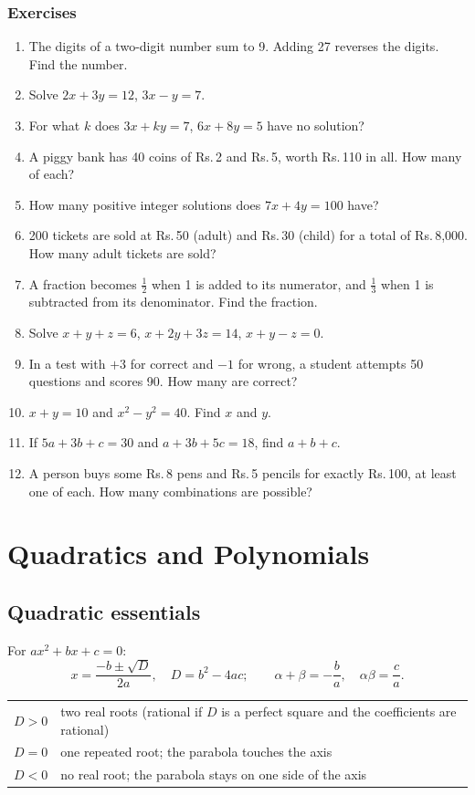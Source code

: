 \documentclass[11pt,a4paper,openany]{report}
\newenvironment{exercises}{\subsection*{Exercises \thechapter}\begin{enumerate}[label=\textbf{\thechapter.\arabic*},leftmargin=3.2em]}{\end{enumerate}}
\newcommand{\Rs}{Rs.\,}
\begin{document}
\begin{exercises}
\item The digits of a two-digit number sum to 9. Adding 27 reverses the digits. Find the number.
\item Solve $2x+3y=12$, $3x-y=7$.
\item For what $k$ does $3x+ky=7$, $6x+8y=5$ have no solution?
\item A piggy bank has 40 coins of \Rs2 and \Rs5, worth \Rs110 in all. How many of each?
\item How many positive integer solutions does $7x+4y=100$ have?
\item 200 tickets are sold at \Rs50 (adult) and \Rs30 (child) for a total of \Rs8,000. How many adult tickets are sold?
\item A fraction becomes $\frac12$ when 1 is added to its numerator, and $\frac13$ when 1 is subtracted from its denominator. Find the fraction.
\item Solve $x+y+z=6$, $x+2y+3z=14$, $x+y-z=0$.
\item In a test with $+3$ for correct and $-1$ for wrong, a student attempts 50 questions and scores 90. How many are correct?
\item $x+y=10$ and $x^2-y^2=40$. Find $x$ and $y$.
\item If $5a+3b+c=30$ and $a+3b+5c=18$, find $a+b+c$.
\item A person buys some \Rs8 pens and \Rs5 pencils for exactly \Rs100, at least one of each. How many combinations are possible?
\end{exercises}

\chapter{Quadratics and Polynomials}\label{ch:quad}

\section{Quadratic essentials}
For $ax^2+bx+c=0$:
\[x=\frac{-b\pm\sqrt{D}}{2a},\quad D=b^2-4ac;\qquad\alpha+\beta=-\frac ba,\quad\alpha\beta=\frac ca.\]
\begin{center}\small
\begin{tabular}{ll}
\toprule
$D>0$ & two real roots (rational if $D$ is a perfect square and the coefficients are rational)\\
$D=0$ & one repeated root; the parabola touches the axis\\
$D<0$ & no real root; the parabola stays on one side of the axis\\
\bottomrule
\end{tabular}
\end{center}
\end{document}
